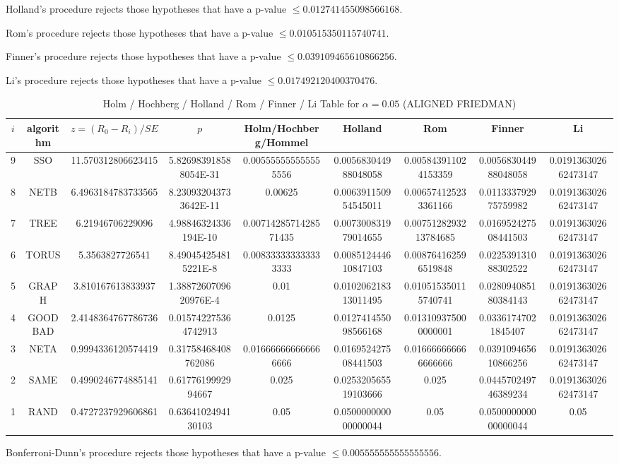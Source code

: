 \documentclass[a4paper,10pt]{article}
\begin{document}
\begin{landscape}
Holland's procedure rejects those hypotheses that have a p-value $\le0.012741455098566168$.


Rom's procedure rejects those hypotheses that have a p-value $\le0.010515350115740741$.


Finner's procedure rejects those hypotheses that have a p-value $\le0.039109465610866256$.


Li's procedure rejects those hypotheses that have a p-value $\le0.017492120400370476$.



\newpage

\begin{table}[!htp]
\centering\scriptsize
\caption{Holm / Hochberg / Holland / Rom / Finner / Li Table for $\alpha=0.05$ (ALIGNED FRIEDMAN)}
\begin{tabular}{ccccccccc}
$i$&algorithm&$z=(R_0 - R_i)/SE$&$p$&Holm/Hochberg/Hommel&Holland&Rom&Finner&Li\\
\hline
9& SSO&11.570312806623415&5.826983918588054E-31&0.005555555555555556&0.005683044988048058&0.005843911024153359&0.005683044988048058&0.019136302662473147\\
8& NETB&6.4963184783733565&8.230932043733642E-11&0.00625&0.006391150954545011&0.006574125233361166&0.011333792975759982&0.019136302662473147\\
7& TREE&6.21946706229096&4.98846324336194E-10&0.0071428571428571435&0.007300831979014655&0.0075128293213784685&0.016952427508441503&0.019136302662473147\\
6& TORUS&5.3563827726541&8.490454254815221E-8&0.008333333333333333&0.008512444610847103&0.008764162596519848&0.022539131088302522&0.019136302662473147\\
5& GRAPH&3.810167613833937&1.3887260709620976E-4&0.01&0.010206218313011495&0.010515350115740741&0.028094085180384143&0.019136302662473147\\
4& GOODBAD&2.4148364767786736&0.015742275364742913&0.0125&0.012741455098566168&0.013109375000000001&0.03361747021845407&0.019136302662473147\\
3& NETA&0.9994336120574419&0.31758468408762086&0.016666666666666666&0.016952427508441503&0.016666666666666666&0.039109465610866256&0.019136302662473147\\
2& SAME&0.4990246774885141&0.6177619992994667&0.025&0.025320565519103666&0.025&0.044570249746389234&0.019136302662473147\\
1& RAND&0.4727237929606861&0.6364102494130103&0.05&0.050000000000000044&0.05&0.050000000000000044&0.05\\
\hline
\end{tabular}
\end{table}
Bonferroni-Dunn's procedure rejects those hypotheses that have a p-value $\le0.005555555555555556$.



\end{landscape}
\end{document}
